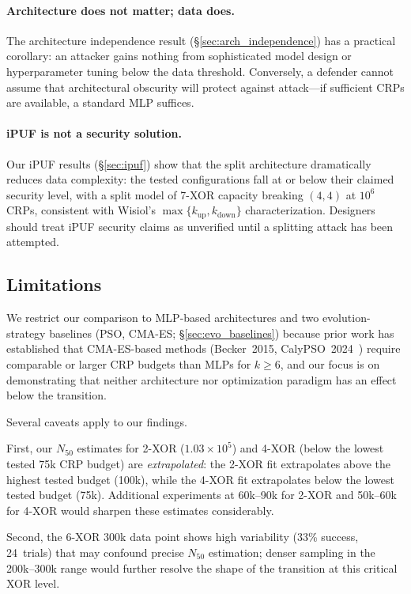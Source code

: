 \paragraph{Architecture does not matter; data does.}
The architecture independence result (\S\ref{sec:arch_independence}) has a
practical corollary: an attacker gains nothing from sophisticated model
design or hyperparameter tuning below the data threshold.  Conversely, a
defender cannot assume that architectural obscurity will protect against
attack---if sufficient CRPs are available, a standard MLP suffices.

\paragraph{iPUF is not a security solution.}
Our iPUF results (\S\ref{sec:ipuf}) show that the split architecture
dramatically reduces data complexity: the tested configurations fall at or
below their claimed security level, with a split model of 7-XOR capacity
breaking $(4,4)$ at $10^6$ CRPs, consistent with Wisiol's
$\max\{k_{\text{up}},k_{\text{down}}\}$ characterization.
Designers should treat iPUF security claims as unverified until a splitting
attack has been attempted.

\subsection{Limitations}
\label{sec:limitations}

We restrict our comparison to MLP-based architectures and two
evolution-strategy baselines (PSO, CMA-ES; \S\ref{sec:evo_baselines})
because prior work has
established that CMA-ES-based methods (Becker~2015,
CalyPSO~2024~\cite{calypso2024}) require comparable or larger CRP budgets
than MLPs for $k \geq 6$, and our focus is on demonstrating
that neither architecture nor optimization paradigm has an effect below the
transition.

Several caveats apply to our findings.

First, our $N_{50}$ estimates for 2-XOR ($1.03\times10^5$) and 4-XOR
(below the lowest tested 75k CRP budget) are \emph{extrapolated}: the
2-XOR fit extrapolates above the highest tested budget (100k), while the
4-XOR fit extrapolates below the lowest tested budget (75k).  Additional
experiments at 60k--90k for 2-XOR and 50k--60k for 4-XOR would sharpen
these estimates considerably.

Second, the 6-XOR 300k data point shows high variability (33\% success,
24~trials) that may confound precise $N_{50}$ estimation; denser sampling
in the 200k--300k range would further resolve the shape of the transition
at this critical XOR level.

